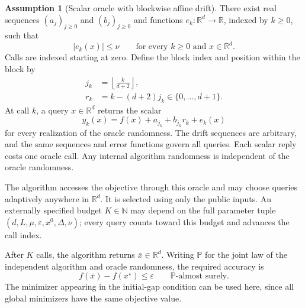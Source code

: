 \documentclass[10pt]{article}
\theoremstyle{definition}
\newtheorem{assumption}{Assumption}
\begin{document}
\begin{assumption}[Scalar oracle with blockwise affine drift]
There exist real sequences $(a_j)_{j\geq0}$ and $(b_j)_{j\geq0}$ and functions $e_k:\mathbb{R}^d\to\mathbb{R}$, indexed by $k\geq0$, such that
\[
|e_k(x)|\leq\nu
\qquad\text{for every }k\geq0\text{ and }x\in\mathbb{R}^d.
\]
Calls are indexed starting at zero. Define the block index and position within the block by
\[
\begin{aligned}
j_k&=\left\lfloor\frac{k}{d+2}\right\rfloor,\\
r_k&=k-(d+2)j_k\in\{0,\ldots,d+1\}.
\end{aligned}
\]
At call $k$, a query $x\in\mathbb{R}^d$ returns the scalar
\[
y_k(x)=f(x)+a_{j_k}+b_{j_k}r_k+e_k(x)
\]
for every realization of the oracle randomness. The drift sequences are arbitrary, and the same sequences and error functions govern all queries. Each scalar reply costs one oracle call. Any internal algorithm randomness is independent of the oracle randomness.
\end{assumption}

The algorithm accesses the objective through this oracle and may choose queries adaptively anywhere in $\mathbb{R}^d$. It is selected using only the public inputs. An externally specified budget $K\in\mathbb{N}$ may depend on the full parameter tuple $(d,L,\mu,\varepsilon,x^0,\Delta,\nu)$; every query counts toward this budget and advances the call index.

After $K$ calls, the algorithm returns $\bar{x}\in\mathbb{R}^d$. Writing $\mathbb{P}$ for the joint law of the independent algorithm and oracle randomness, the required accuracy is
\[
f(\bar{x})-f(x^\star)\leq\varepsilon
\qquad\mathbb{P}\text{-almost surely}.
\]
The minimizer appearing in the initial-gap condition can be used here, since all global minimizers have the same objective value.
\end{document}
